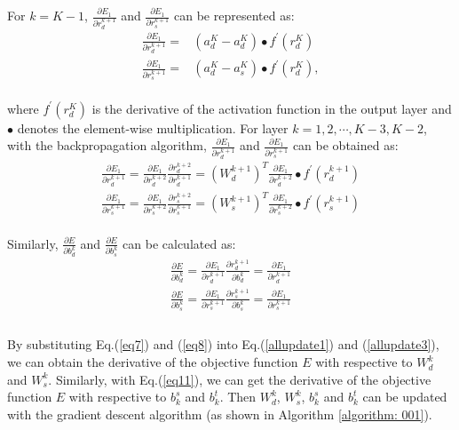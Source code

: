 \documentclass{article}
\begin{document}
For $k=K-1$, $\frac{\partial E_1 }{\partial r_{d}^{k+1}}$ and $\frac{\partial E_1 }{\partial r_{s}^{k+1}}$ can be represented as:
\begin{equation}
	\begin{aligned}
	\frac{\partial E_1 }{\partial r_{d}^{k+1}} =&(a_d^K-a_d^K)\bullet f^{'}(r_d^K)\\
	\frac{\partial E_1 }{\partial r_{s}^{k+1}} =&(a_d^K-a_s^K)\bullet f^{'}(r_d^K),   
	\end{aligned}
\end{equation}
\\
where $f^{'}(r_d^K)$ is the derivative of the activation function in the output layer and $\bullet$ denotes the element-wise multiplication. For layer $k=1, 2, \cdots, K-3, K-2$, with the backpropagation algorithm, $\frac{\partial E_1 }{\partial r_{d}^{k+1}}$ and $\frac{\partial E_1 }{\partial r_{s}^{k+1}}$ can be obtained as:
\begin{equation}
	\begin{aligned}
	\frac{\partial E_1 }{\partial r_{d}^{k+1}} =\frac{\partial E_1 }{\partial r_{d}^{k+2}}\frac{\partial r_{d}^{k+2}}{\partial r_{d}^{k+1}}=(W_d^{k+1})^T\frac{\partial E_1 }{\partial r_{d}^{k+2}}\bullet f^{'}(r_d^{k+1}) \\
	 \frac{\partial E_1 }{\partial r_{s}^{k+1}} =\frac{\partial E_1 }{\partial r_{s}^{k+2}}\frac{\partial r_{s}^{k+2}}{\partial r_{s}^{k+1}}=(W_s^{k+1})^T\frac{\partial E_1 }{\partial r_{s}^{k+2}}\bullet f^{'}(r_s^{k+1})  
	\end{aligned}
\end{equation}
\\
Similarly, $\frac{\partial E}{\partial b_d^k}$ and $\frac{\partial E}{\partial b_s^k}$ can be calculated as:
\begin{equation}
	\begin{aligned}
	\frac{\partial E}{\partial b_d^k}=\frac{\partial E_1 }{\partial r_{d}^{k+1}}\frac{\partial r_{d}^{k+1}}{\partial b_d^k}=\frac{\partial E_1 }{\partial r_{d}^{k+1}}\\
	\frac{\partial E}{\partial b_s^k}=\frac{\partial E_1 }{\partial r_{s}^{k+1}}\frac{\partial r_{s}^{k+1}}{\partial b_s^k}=\frac{\partial E_1 }{\partial r_{s}^{k+1}}\\
	\end{aligned}
\label{eq11}
\end{equation}
\\
By substituting Eq.(\ref{eq7}) and  (\ref{eq8}) into Eq.(\ref{allupdate1}) and (\ref{allupdate3}), we can obtain the derivative of the objective function $E$ with respective to $W_d^k$ and $W_s^k$. Similarly, with Eq.(\ref{eq11}), we can get the derivative of the objective function $E$ with respective to $b_k^s$ and $b_k^t$. Then $W_d^k$, $W_s^k$, $b_k^s$ and $b_k^t$ can be updated with the gradient descent algorithm (as shown in Algorithm \ref{algorithm: 001}).\\
\end{document}
